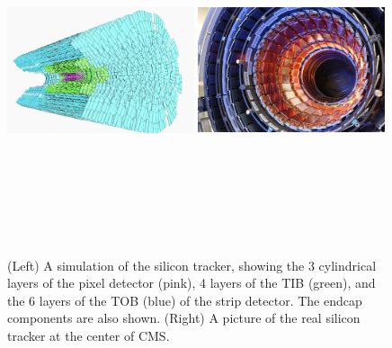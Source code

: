 \begin{figure}[pbth]
\centering
\includegraphics[width=0.49\textwidth,height=10cm,keepaspectratio]{figures/cms/tracker/silicon_tracker_simulated.png}
\includegraphics[width=0.49\textwidth,height=10cm,keepaspectratio]{figures/cms/tracker/silicon_tracker_real.jpg}
    \caption{
    (Left) A simulation of the silicon tracker, showing the 3 cylindrical layers of the pixel detector (pink), 4 layers of the TIB (green), and the 6 layers of the TOB (blue) of the strip detector.
    The endcap components are also shown.
    (Right) A picture of the real silicon tracker at the center of CMS.} 
    \label{fig:tracker_real}
\end{figure}
